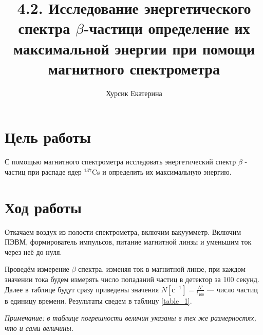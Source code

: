 \documentclass[12pt]{kiarticle} %
\title{4.2. Исследование энергетического спектра $\beta$-частици определение их максимальной
энергии при помощи магнитного спектрометра}
\author{Хурсик Екатерина}
\begin{document}
	
\maketitle
\section{Цель работы}

	С помощью магнитного спектрометра исследовать энергетический спектр $\beta$ - частиц при распаде ядер $^{137}$Cs  и определить их максимальную энергию.	

\section{Ход работы}

	Откачаем воздух из полости спектрометра, включим вакуумметр. Включим ПЭВМ, формирователь импульсов, питание магнитной линзы и уменьшим ток через неё до нуля. 

	Проведём измерение $\beta$-спектра, изменяя ток в магнитной линзе, при каждом значении тока будем измерять число попаданий частиц в детектор за 100 секунд. Далее в таблице будут сразу приведены значения $ N[с^{-1}] = \frac{N'}{t_{100}} $ --- число частиц в единицу времени. Результаты сведем в таблицу \ref{table_1}. 

	\textit{Примечание: в таблице погрешности величин указаны в тех же размерностях, что и сами величины.}
\end{document}
